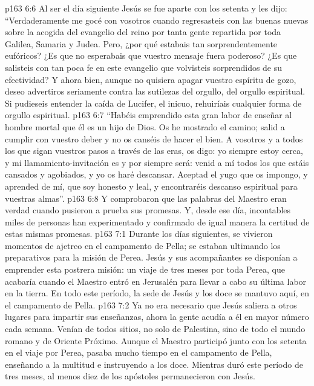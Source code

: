 \vs p163 6:6 \pc Al ser el día siguiente  Jesús se fue aparte con los setenta y les dijo: “Verdaderamente me gocé con vosotros cuando regresasteis con las buenas nuevas sobre la acogida del evangelio del reino por tanta gente repartida por toda Galilea, Samaria y Judea. Pero, ¿por qué estabais tan sorprendentemente eufóricos? ¿Es que no esperabais que vuestro mensaje fuera poderoso? ¿Es que salisteis con tan poca fe en este evangelio que volvisteis sorprendidos de su efectividad? Y ahora bien, aunque no quisiera apagar vuestro espíritu de gozo, deseo advertiros seriamente contra las sutilezas del orgullo, del orgullo espiritual. Si pudieseis entender la caída de Lucifer, el inicuo, rehuiríais cualquier forma de orgullo espiritual.
\vs p163 6:7 “Habéis emprendido esta gran labor de enseñar al hombre mortal que él es un hijo de Dios. Os he mostrado el camino; salid a cumplir con vuestro deber y no os canséis de hacer el bien. A vosotros y a todos los que sigan vuestros pasos a través de las eras, os digo: yo siempre estoy cerca, y mi llamamiento\hyp{}invitación es y por siempre será: venid a mí todos los que estáis cansados y agobiados, y yo os haré descansar. Aceptad el yugo que os impongo, y aprended de mí, que soy honesto y leal, y encontraréis descanso espiritual para vuestras almas”.
\vs p163 6:8 \pc Y comprobaron que las palabras del Maestro eran verdad cuando pusieron a prueba sus promesas. Y, desde ese día, incontables miles de personas han experimentado y confirmado de igual manera la certitud de estas mismas promesas.
\vs p163 7:1 Durante los días siguientes, se vivieron momentos de ajetreo en el campamento de Pella; se estaban ultimando los preparativos para la misión de Perea. Jesús y sus acompañantes se disponían a emprender esta postrera misión: un viaje de tres meses por toda Perea, que acabaría cuando el Maestro entró en Jerusalén para llevar a cabo su última labor en la tierra. En todo este período, la sede de Jesús y los doce se mantuvo aquí, en el campamento de Pella.
\vs p163 7:2 Ya no era necesario que Jesús saliera a otros lugares para impartir sus enseñanzas, ahora la gente acudía a él en mayor número cada semana. Venían de todos sitios, no solo de Palestina, sino de todo el mundo romano y de Oriente Próximo. Aunque el Maestro participó junto con los setenta en el viaje por Perea, pasaba mucho tiempo en el campamento de Pella, enseñando a la multitud e instruyendo a los doce. Mientras duró este período de tres meses, al menos diez de los apóstoles permanecieron con Jesús.
